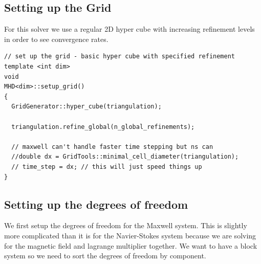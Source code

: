 \documentclass{article}
\begin{document}
\subsection*{Setting up the Grid}
For this solver we use a regular 2D hyper cube with increasing refinement levels in order to see convergence rates. 
\begin{lstlisting}
// set up the grid - basic hyper cube with specified refinement
template <int dim>
void
MHD<dim>::setup_grid()
{
  GridGenerator::hyper_cube(triangulation);

  triangulation.refine_global(n_global_refinements);

  // maxwell can't handle faster time stepping but ns can
  //double dx = GridTools::minimal_cell_diameter(triangulation);
  // time_step = dx; // this will just speed things up
}
\end{lstlisting}

\subsection*{Setting up the degrees of freedom}
We first setup the degrees of freedom for the Maxwell system. This is slightly more complicated than it is for the Navier-Stokes system because we are solving for the magnetic field and lagrange multiplier together. We want to have a block system so we need to sort the degrees of freedom by component.
\end{document}
